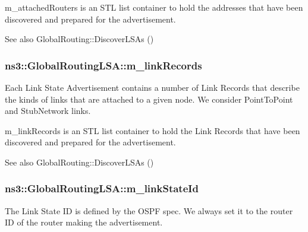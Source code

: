 m\+\_\+attached\+Routers is an S\+TL list container to hold the addresses that have been discovered and prepared for the advertisement.

\begin{DoxySeeAlso}{See also}
Global\+Routing\+::\+Discover\+L\+S\+As () 
\end{DoxySeeAlso}
\subsubsection[{\texorpdfstring{m\+\_\+link\+Records}{m_linkRecords}}]{ ns3\+::\+Global\+Routing\+L\+S\+A\+::m\+\_\+link\+Records\hspace{0.3cm}{\ttfamily [private]}}\hypertarget{classns3_1_1GlobalRoutingLSA_a67b7b857643304afcd395debe0498363}{}\label{classns3_1_1GlobalRoutingLSA_a67b7b857643304afcd395debe0498363}
Each Link State Advertisement contains a number of Link Records that describe the kinds of links that are attached to a given node. We consider Point\+To\+Point and Stub\+Network links.

m\+\_\+link\+Records is an S\+TL list container to hold the Link Records that have been discovered and prepared for the advertisement.

\begin{DoxySeeAlso}{See also}
Global\+Routing\+::\+Discover\+L\+S\+As () 
\end{DoxySeeAlso}
\subsubsection[{\texorpdfstring{m\+\_\+link\+State\+Id}{m_linkStateId}}]{ ns3\+::\+Global\+Routing\+L\+S\+A\+::m\+\_\+link\+State\+Id\hspace{0.3cm}{\ttfamily [private]}}\hypertarget{classns3_1_1GlobalRoutingLSA_a39580ef7a79397ef08b0480e1a606e7a}{}\label{classns3_1_1GlobalRoutingLSA_a39580ef7a79397ef08b0480e1a606e7a}
The Link State ID is defined by the O\+S\+PF spec. We always set it to the router ID of the router making the advertisement.

